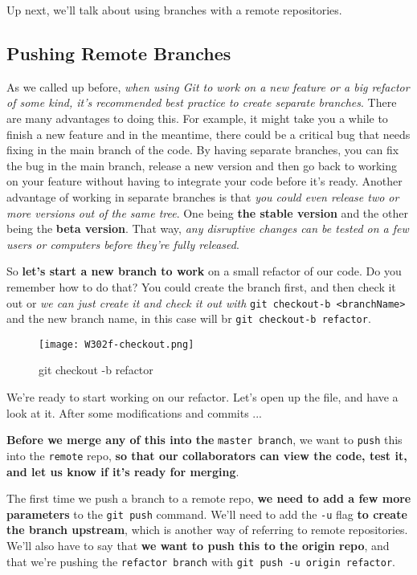 	Up next, we'll talk about using branches with a remote repositories.

	\subsection{Pushing Remote Branches} \label{W303b}
	
	As we called up before, \textit{when using Git to work on a new feature or a big refactor of some kind, it's recommended best practice to create separate branches}. There are many advantages to doing this. For example, it might take you a while to finish a new feature and in the meantime, there could be a critical bug that needs fixing in the main branch of the code. By having separate branches, you can fix the bug in the main branch, release a new version and then go back to working on your feature without having to integrate your code before it's ready. Another advantage of working in separate branches is that \textit{you could even release two or more versions out of the same tree}. One being \textbf{the stable version} and the other being the \textbf{beta version}. That way, \textit{any disruptive changes can be tested on a few users or computers before they're fully released}. 
	
	So \textbf{let's start a new branch to work} on a small refactor of our code. Do you remember how to do that? You could create the branch first, and then check it out or \textit{we can just create it and check it out with} \verb|git checkout-b <branchName>| and the new branch name, in this case will br \verb|git checkout-b refactor|.
	
	\begin{figure} 
		\caption{git checkout -b refactor}
		\centering
		\texttt{[image: W302f-checkout.png]}
		\label{W302f-checkout}
	\end{figure}
	
	
	We're ready to start working on our refactor. Let's open up the file, and have a look at it.
	After some modifications and commits ...
	
\textbf{	Before we merge any of this into the }\verb|master branch|, we want to \verb|push| this into the \verb|remote| repo, \textbf{so that our collaborators can view the code, test it, and let us know if it's ready for merging}.
	
	The first time we push a branch to a remote repo, \textbf{we need to add a few more parameters} to the \verb|git push| command. 
	We'll need to add the \verb|-u| flag \textbf{to create the branch upstream}, which is another way of referring to remote repositories. We'll also have to say that \textbf{we want to push this to the origin repo}, and that we're pushing the \verb|refactor branch| with \verb|git push -u origin refactor|.
	
